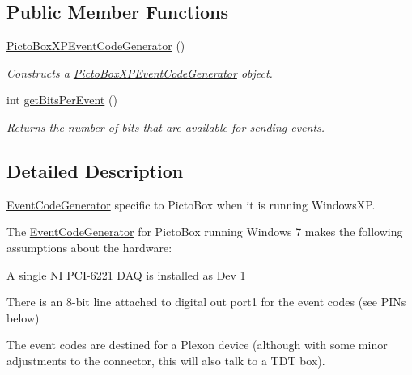 \subsection*{Public Member Functions}
\begin{DoxyCompactItemize}
\item 
\hyperlink{class_picto_1_1_picto_box_x_p_event_code_generator_af6ee975918e32c1a02154dc035e7a764}{Picto\-Box\-X\-P\-Event\-Code\-Generator} ()
\begin{DoxyCompactList}\small\item\em Constructs a \hyperlink{class_picto_1_1_picto_box_x_p_event_code_generator}{Picto\-Box\-X\-P\-Event\-Code\-Generator} object. \end{DoxyCompactList}\item 
int \hyperlink{class_picto_1_1_picto_box_x_p_event_code_generator_a6a3e7a0b260d96b65be5bf860baa5921}{get\-Bits\-Per\-Event} ()
\begin{DoxyCompactList}\small\item\em Returns the number of bits that are available for sending events. \end{DoxyCompactList}\end{DoxyCompactItemize}


\subsection{Detailed Description}
\hyperlink{class_picto_1_1_event_code_generator}{Event\-Code\-Generator} specific to Picto\-Box when it is running Windows\-X\-P. 

The \hyperlink{class_picto_1_1_event_code_generator}{Event\-Code\-Generator} for Picto\-Box running Windows 7 makes the following assumptions about the hardware\-:
\begin{DoxyItemize}
\item A single N\-I P\-C\-I-\/6221 D\-A\-Q is installed as Dev 1
\item There is an 8-\/bit line attached to digital out port1 for the event codes (see P\-I\-Ns below)
\item The event codes are destined for a Plexon device (although with some minor adjustments to the connector, this will also talk to a T\-D\-T box).
\end{DoxyItemize}

